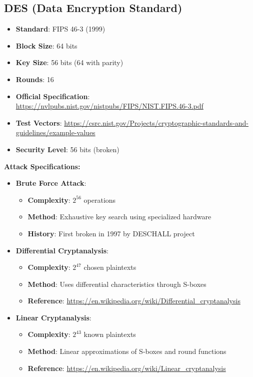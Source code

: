 \documentclass[11pt,a4paper]{article}
\begin{document}
\subsection{DES (Data Encryption Standard)}
\begin{itemize}
    \item \textbf{Standard}: FIPS 46-3 (1999)
    \item \textbf{Block Size}: 64 bits
    \item \textbf{Key Size}: 56 bits (64 with parity)
    \item \textbf{Rounds}: 16
    \item \textbf{Official Specification}: \url{https://nvlpubs.nist.gov/nistpubs/FIPS/NIST.FIPS.46-3.pdf}
    \item \textbf{Test Vectors}: \url{https://csrc.nist.gov/Projects/cryptographic-standards-and-guidelines/example-values}
    \item \textbf{Security Level}: 56 bits (broken)
\end{itemize}

\textbf{Attack Specifications:}
\begin{itemize}
    \item \textbf{Brute Force Attack}: 
    \begin{itemize}
        \item \textbf{Complexity}: $2^{56}$ operations
        \item \textbf{Method}: Exhaustive key search using specialized hardware
        \item \textbf{History}: First broken in 1997 by DESCHALL project
    \end{itemize}
    \item \textbf{Differential Cryptanalysis}: 
    \begin{itemize}
        \item \textbf{Complexity}: $2^{47}$ chosen plaintexts
        \item \textbf{Method}: Uses differential characteristics through S-boxes
        \item \textbf{Reference}: \url{https://en.wikipedia.org/wiki/Differential_cryptanalysis}
    \end{itemize}
    \item \textbf{Linear Cryptanalysis}: 
    \begin{itemize}
        \item \textbf{Complexity}: $2^{43}$ known plaintexts
        \item \textbf{Method}: Linear approximations of S-boxes and round functions
        \item \textbf{Reference}: \url{https://en.wikipedia.org/wiki/Linear_cryptanalysis}
    \end{itemize}
\end{itemize}
\end{document}
